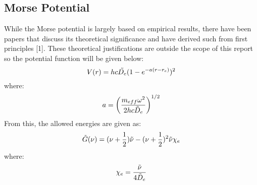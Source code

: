 \documentclass[letterpaper,12pt]{article}
\begin{document}
\subsection{Morse Potential}
While the Morse potential is largely based on empirical results, there have been papers that discuss its theoretical significance and have derived such from first principles [1]. These theoretical justifications are outside the scope of this report so the potential function will be given below:
\begin{equation}
    V(r)=hc\Tilde{D_e}(1-e^{-a(r-r_e)})^2
\end{equation}
where:
\begin{equation}
    a=\left(\frac{m_{eff}\omega^2}{2hc\Tilde{D}_e}\right)^{1/2}
\end{equation}
From this, the allowed energies are given as:
\begin{equation}
    \Tilde{G}(\nu)=(\nu+\frac{1}{2})\Tilde{\nu}-(\nu+\frac{1}{2})^2\Tilde{\nu}\chi_e
\end{equation}
where:
\begin{equation}
    \chi_e=\frac{\Tilde{\nu}}{4\Tilde{D}_e}
\end{equation}
\end{document}
